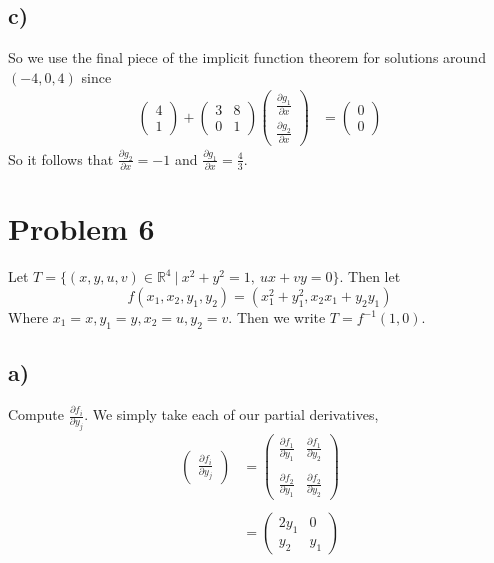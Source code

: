 \documentclass{article}
\theoremstyle{definition}
\begin{document}
\subsection*{c)}
So we use the final piece of the implicit function theorem for solutions around $(-4,0,4)$ since 
\begin{align*}
    \begin{pmatrix}
        4\\1
    \end{pmatrix} + \begin{pmatrix}
        3 & 8 \\ 0 & 1
    \end{pmatrix}\begin{pmatrix}\frac{\partial g_1}{\partial x} \\ \frac{\partial g_2}{\partial x}\end{pmatrix} & = \begin{pmatrix}
        0 \\ 0
    \end{pmatrix}
\end{align*}
So it follows that $\frac{\partial g_2}{\partial x} = -1$ and $\frac{\partial g_1}{\partial x} = \frac{4}{3}$.
\section*{Problem 6}
\begin{mdframed}
    Let $T = \{(x,y,u,v) \in \mathbb{R}^4 \ | \ x^2 + y^2 = 1, \ ux + vy = 0\}$. Then let 
    \[
        f(x_1,x_2,y_1,y_2) = (x_1^2+y_1^2, x_2x_1 + y_2y_1)
    \]
    Where $x_1 = x, y_1 = y, x_2 = u, y_2 = v$. Then we write $T = f^{-1}(1,0)$.
\end{mdframed} 
\subsection*{a)}
Compute $\frac{\partial f_i}{\partial y_j}$.
We simply take each of our partial derivatives,
\begin{align*}
    \begin{pmatrix}
        \frac{\partial f_i}{\partial y_j}
    \end{pmatrix} &= \begin{pmatrix}
        \frac{\partial f_1}{\partial y_1}& \frac{\partial f_1}{\partial y_2}\\\\
        \frac{\partial f_2}{\partial y_1} & \frac{\partial f_2}{\partial y_2}
    \end{pmatrix} \\\\
    &= \begin{pmatrix}
        2y_1 & 0 \\
        y_2 & y_1
    \end{pmatrix}
\end{align*}
\end{document}
